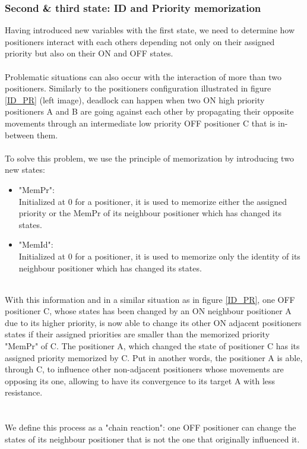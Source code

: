 \documentclass[]{spie}  %
\begin{document}
	\subsubsection{Second \& third state: ID and Priority memorization}
	Having introduced new variables with the first state, we need to determine how positioners interact with each others depending not only on their assigned priority but also on their  ON and OFF states.\\\\
	Problematic situations can also occur with the interaction of more than two positioners. Similarly to the positioners configuration illustrated in figure \ref{ID_PR} (left image), deadlock can happen when two ON high priority positioners A and B are going against each other by propagating their opposite movements through an intermediate low priority OFF positioner C that is in-between them.\\\\
	To solve this problem, we use the principle of memorization by introducing two new states: 
	\begin{itemize}
		\item "MemPr":  \\
		Initialized at 0 for a positioner, it is used to memorize either the assigned priority or the MemPr of its neighbour positioner which has changed its  states.\\
		\item "MemId": \\
		Initialized at 0 for a positioner, it is used to memorize only the identity of its neighbour positioner which has changed its states.
	\end{itemize}\\
	  With this information and in a similar situation as in figure \ref{ID_PR}, one OFF positioner C, whose states has been changed by an ON neighbour positioner A due to its higher priority, is now able to change its other ON adjacent positioners states if their assigned priorities are smaller than the memorized priority "MemPr" of C. The positioner A, which changed the state of positioner C has its assigned priority memorized by C.  Put in another words, the positioner A is able, through C, to influence other non-adjacent positioners whose movements are opposing its one, allowing to have its convergence to its target A with less resistance.\\\\\\
	 We define this process as a "chain reaction": one OFF positioner can change the states of its neighbour positioner that is not the one that originally influenced it. \\
	 
\end{document}
